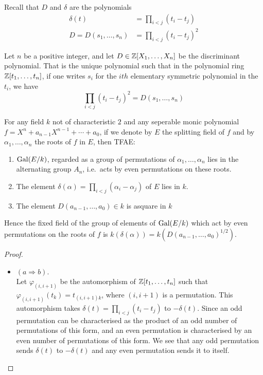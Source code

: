 	\begin{bergman}
    Recall that $D$ and $\delta$ are the polynomials 
		\begin{align*}
			\delta(t) &= \prod_{i<j}(t_i-t_j)\\
			D = D(s_1,\ldots,s_n)&= \prod_{i<j}{(t_i-t_j)}^2
		\end{align*}
    \begin{lemma}
  Let $n$ be a positive integer, and let $D\in \mathbb{Z}[X_1,\ldots,X_n]$ be the discriminant polynomial. That is the unique polynomial such that in the polynomial ring $\mathbb{Z}[t_1,\ldots,t_n]$, if one writes $s_i$ for the $ith$ elementary symmetric polynomial in the $t_i$, we have \[
\prod_{i<j} {(t_i-t_j)}^2 = D(s_1,\ldots,s_n)  
\]

  For any field $k$ not of characteristic $2$ and any seperable monic polynomial $f = X^n + a_{n-1}X^{n-1}+\cdots + a_0$, if we denote by $E$ the splitting field of $f$ and by $\alpha_1,\ldots,\alpha_n$ the roots of $f$ in $E$, then TFAE:\begin{enumerate}[label = (\alph*)]
    \item $\text{Gal}(E/k)$, regarded as a group of permutations of $\alpha_1,\ldots,\alpha_n$ lies in the alternating group $A_n$, i.e.~acts by even permutations on these roots.
    \item The element $\delta(\alpha) = \prod_{i<j}(\alpha_i-\alpha_j)$ of $E$ lies in $k$.
    \item The element $D(a_{n-1},\ldots,a_0)\in k$ is  asquare in $k$
  \end{enumerate}
  Hence the fixed field of the group of elements of $\text{Gal}(E/k)$ which act by even permutations on the roots of $f$ is $k(\delta(\alpha)) = k({D(a_{n-1},\ldots,a_0)}^{1/2})$.
\end{lemma}
\begin{proof}
  \begin{itemize}
    \item $(a\Rightarrow b)$. \\ Let $\varphi_{(i,i+1)}$ be the automorphism of $\mathbb{Z}[t_1,\ldots,t_n]$ such that $\varphi_{(i,i+1)}(t_k) = t_{(i,i+1)k}$, where $(i,i+1)$ is a permutation. This automorphism takes $\delta(t) = \prod_{i<j}(t_i-t_j)$ to $-\delta(t)$. Since an odd permutation can be characterised as the product of an odd number of permutations of this form, and an even permutation is characterised by an even number of permutations of this form.
    We see that any odd permutation sends $\delta(t)$ to $-\delta(t)$ and any even permutation sends it to itself.


\end{itemize}
\end{proof}
\end{bergman}
